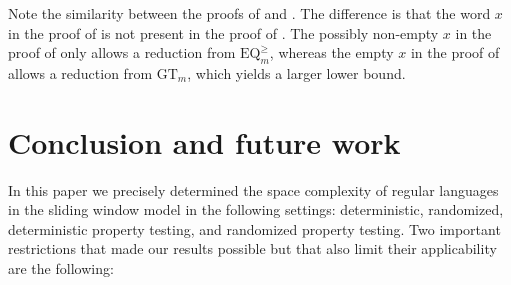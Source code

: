 \documentclass{theoretics}
\renewcommand{\geq}{\geqslant}
\begin{document}
Note the similarity between the proofs of   and . The difference
is that the word $x$ in the proof of  is not present in the proof of .
The possibly non-empty $x$ in the proof of  only allows a reduction from $\mathrm{EQ}^{\geq}_m$,
whereas the empty $x$ in the proof of  allows a reduction from $\mathrm{GT}_m$, which
yields a larger lower bound.


\section{Conclusion and future work}

In this paper we precisely determined the space complexity of regular languages in the sliding window model
in the following settings: deterministic, randomized, deterministic property testing, and randomized property testing.
Two important restrictions that made our results possible but that also
 limit their applicability are the following:
\end{document}
